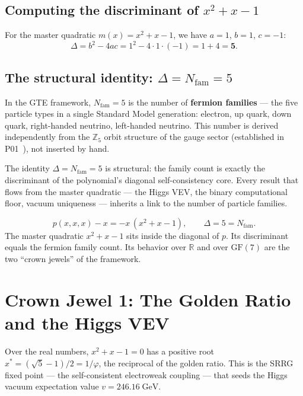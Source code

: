 \documentclass[11pt,a4paper]{article}
\newcommand{\term}[1]{\textbf{#1}}
\newcommand{\Nfam}{N_{\mathrm{fam}}}
\begin{document}
\subsection{Computing the discriminant of $x^2 + x - 1$}

For the master quadratic $m(x) = x^2 + x - 1$, we have $a = 1$, $b = 1$, $c = -1$:
\[
  \Delta
  = b^2 - 4ac
  = 1^2 - 4 \cdot 1 \cdot (-1)
  = 1 + 4
  = \mathbf{5}.
\]

\subsection{The structural identity: $\Delta = \Nfam = 5$}

In the GTE framework, $\Nfam = 5$ is the number of \term{fermion families} — the
five particle types in a single Standard Model generation: electron, up quark,
down quark, right-handed neutrino, left-handed neutrino.  This number is derived
independently from the $\mathbb{Z}_5$ orbit structure of the gauge sector (established
in P01~\cite{SpivackSM}), not inserted by hand.

The identity $\Delta = \Nfam = 5$ is structural: the family count is exactly the
discriminant of the polynomial's diagonal self-consistency core.  Every result that
flows from the master quadratic — the Higgs VEV, the binary computational floor,
vacuum uniqueness — inherits a link to the number of particle families.

\begin{tcolorbox}[colback=boxorange,colframe=orange!60!black,title=Summary so far]
\[
  p(x,x,x) - x = -x\,(x^2 + x - 1), \qquad \Delta = 5 = \Nfam.
\]
The master quadratic $x^2 + x - 1$ sits inside the diagonal of $p$.
Its discriminant equals the fermion family count.
Its behavior over $\mathbb{R}$ and over $\mathrm{GF}(7)$ are the two
``crown jewels'' of the framework.
\end{tcolorbox}

\section{Crown Jewel 1: The Golden Ratio and the Higgs VEV}

\begin{tcolorbox}[colback=boxgold,colframe=orange!70!black,
  title=Crown Jewel 1 — over $\mathbb{R}$]
Over the real numbers, $x^2 + x - 1 = 0$ has a positive root
$x^* = (\sqrt{5}-1)/2 = 1/\varphi$, the reciprocal of the golden ratio.
This is the SRRG fixed point — the self-consistent electroweak coupling —
that seeds the Higgs vacuum expectation value $v = 246.16\;\mathrm{GeV}$.
\end{tcolorbox}
\end{document}
